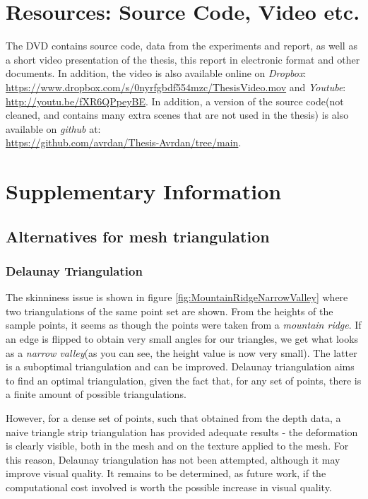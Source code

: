 \documentclass[]{article}
\begin{document}
\begin{appendices}

\section{Resources: Source Code, Video etc.}
\label{appendix:A}

The DVD contains source code, data from the experiments and report, as well as a short video presentation of the thesis, this report in electronic format and other documents. In addition, the video is also available online on \textit{Dropbox}:\\ \url{https://www.dropbox.com/s/0nyrfgbdf554mzc/ThesisVideo.mov} and \textit{Youtube}:\\ \url{http://youtu.be/fXR6QPpeyBE}. In addition, a version of the source code(not cleaned, and contains many extra scenes that are not used in the thesis) is also available on \textit{github} at:\\ \url{https://github.com/avrdan/Thesis-Avrdan/tree/main}.

\clearpage{\pagestyle{empty}\cleardoublepage}


\section{Supplementary Information}
\label{appendix:B}
\subsection{Alternatives for mesh triangulation}

\subsubsection{Delaunay Triangulation}
\label{appendix:B-delaunay}
The skinniness issue is shown in figure \ref{fig:MountainRidgeNarrowValley} where two triangulations of the same point set are shown. From the heights of the sample points, it seems as though the points were taken from a \textit{mountain ridge}. If an edge is flipped to obtain very small angles for our triangles, we get what looks as a \textit{narrow valley}(as you can see, the height value is now very small). The latter is a suboptimal triangulation and can be improved. Delaunay triangulation aims to find an optimal triangulation, given the fact that, for any set of points, there is a finite amount of possible triangulations.

However, for a dense set of points, such that obtained from the depth data, a naive triangle strip triangulation has provided adequate results - the deformation is clearly visible, both in the mesh and on the texture applied to the mesh. For this reason, Delaunay triangulation has not been attempted, although it may improve visual quality. It remains to be determined, as future work, if the computational cost involved is worth the possible increase in visual quality.


\end{appendices}
\end{document}
